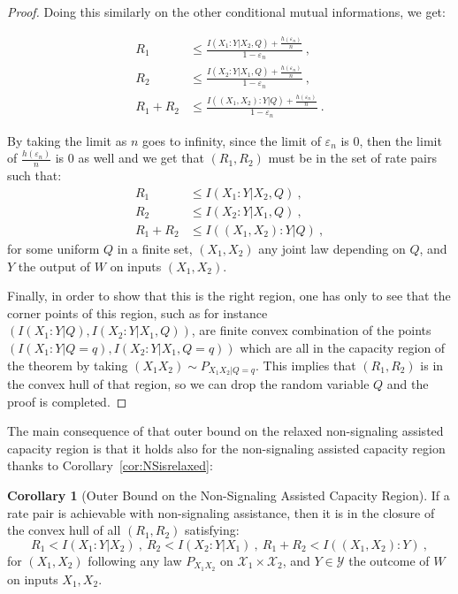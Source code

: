 \documentclass[11pt]{article}
\theoremstyle{definition}
\newtheorem{cor}[theo]{Corollary}
\theoremstyle{remark}
\begin{document}
\begin{proof}
    Doing this similarly on the other conditional mutual informations, we get:

    \begin{equation}
      \begin{aligned}
        R_1 &\leq \frac{I(X_1:Y|X_2,Q)+\frac{h(\varepsilon_n)}{n}}{1-\varepsilon_n}\ ,\\
        R_2 &\leq \frac{I(X_2:Y|X_1,Q)+\frac{h(\varepsilon_n)}{n}}{1-\varepsilon_n} \ ,\\
        R_1+R_2 &\leq  \frac{I((X_1,X_2):Y|Q)+\frac{h(\varepsilon_n)}{n}}{1-\varepsilon_n} \ .
      \end{aligned}
    \end{equation}

    By taking the limit as $n$ goes to infinity, since the limit of $\varepsilon_n$ is $0$, then the limit of $\frac{h(\varepsilon_n)}{n}$ is $0$ as well and we get that $(R_1,R_2)$ must be in the set of rate pairs such that:
    \begin{equation}
      \begin{aligned}
        R_1 &\leq I(X_1:Y|X_2,Q) \ ,\\
        R_2 &\leq I(X_2:Y|X_1,Q) \ ,\\
        R_1+R_2 &\leq I((X_1,X_2):Y|Q) \ ,
      \end{aligned}
    \end{equation}
    for some uniform $Q$ in a finite set, $(X_1,X_2)$ any joint law depending on $Q$, and $Y$ the output of $W$ on inputs $(X_1,X_2)$.

    Finally, in order to show that this is the right region, one has only to see that the corner points of this region, such as for instance $(I(X_1:Y|Q),I(X_2:Y|X_1,Q))$, are finite convex combination of the points $(I(X_1:Y|Q=q),I(X_2:Y|X_1,Q=q))$ which are all in the capacity region of the theorem by taking $(X_1X_2) \sim P_{X_1X_2|Q=q}$. This implies that $(R_1,R_2)$ is in the convex hull of that region, so we can drop the random variable $Q$ and the proof is completed.
      \end{proof}

      The main consequence of that outer bound on the relaxed non-signaling assisted capacity region is that it holds also for the non-signaling assisted capacity region thanks to Corollary~\ref{cor:NSisrelaxed}:

      \begin{cor}[Outer Bound on the Non-Signaling Assisted Capacity Region]
        \label{cor:OB}
        If a rate pair is achievable with non-signaling assistance, then it is in the closure of the convex hull of all $(R_1,R_2)$ satisfying:
        \[ R_1 < I(X_1:Y|X_2)\ ,\ R_2 < I(X_2:Y|X_1)\ ,\ R_1+R_2 < I((X_1,X_2):Y) \ ,\]
        for $(X_1,X_2)$ following any law $P_{X_1X_2}$ on $\mathcal{X}_1 \times \mathcal{X}_2$, and $Y \in \mathcal{Y}$ the outcome of $W$ on inputs $X_1,X_2$.
      \end{cor}
\end{document}
